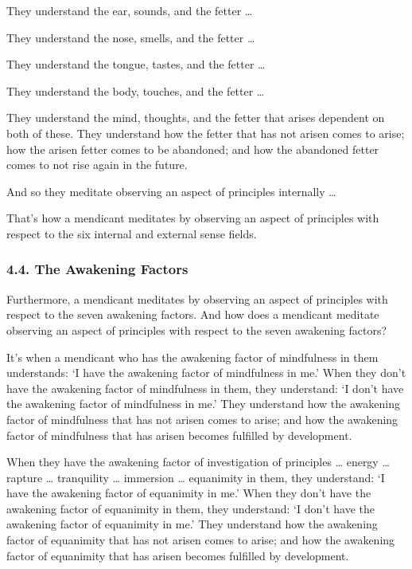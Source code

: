 \documentclass[12pt,openany]{book}%
\begin{document}
They understand the ear, sounds, and the fetter … 

They understand the nose, smells, and the fetter … 

They understand the tongue, tastes, and the fetter … 

They understand the body, touches, and the fetter … 

They understand the mind, thoughts, and the fetter that arises dependent on both of these. They understand how the fetter that has not arisen comes to arise; how the arisen fetter comes to be abandoned; and how the abandoned fetter comes to not rise again in the future. 

And so they meditate observing an aspect of principles internally … 

That’s how a mendicant meditates by observing an aspect of principles with respect to the six internal and external sense fields. 

\subsubsection*{4.4. The Awakening Factors }

Furthermore, a mendicant meditates by observing an aspect of principles with respect to the seven awakening factors. And how does a mendicant meditate observing an aspect of principles with respect to the seven awakening factors? 

It’s when a mendicant who has the awakening factor of mindfulness in them understands: ‘I have the awakening factor of mindfulness in me.’ When they don’t have the awakening factor of mindfulness in them, they understand: ‘I don’t have the awakening factor of mindfulness in me.’ They understand how the awakening factor of mindfulness that has not arisen comes to arise; and how the awakening factor of mindfulness that has arisen becomes fulfilled by development. 

When they have the awakening factor of investigation of principles … energy … rapture … tranquility … immersion … equanimity in them, they understand: ‘I have the awakening factor of equanimity in me.’ When they don’t have the awakening factor of equanimity in them, they understand: ‘I don’t have the awakening factor of equanimity in me.’ They understand how the awakening factor of equanimity that has not arisen comes to arise; and how the awakening factor of equanimity that has arisen becomes fulfilled by development. 
\end{document}
